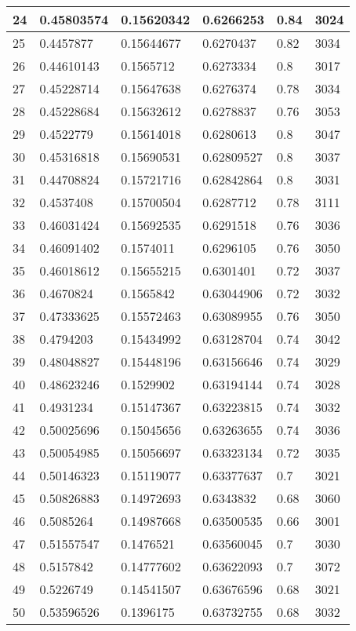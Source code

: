 \begin{longtable}{|l|l|l|l|l|l|}
24 & 0.45803574 & 0.15620342 & 0.6266253 & 0.84 & 3024 \\ \hline 
25 & 0.4457877 & 0.15644677 & 0.6270437 & 0.82 & 3034 \\ \hline 
26 & 0.44610143 & 0.1565712 & 0.6273334 & 0.8 & 3017 \\ \hline 
27 & 0.45228714 & 0.15647638 & 0.6276374 & 0.78 & 3034 \\ \hline 
28 & 0.45228684 & 0.15632612 & 0.6278837 & 0.76 & 3053 \\ \hline 
29 & 0.4522779 & 0.15614018 & 0.6280613 & 0.8 & 3047 \\ \hline 
30 & 0.45316818 & 0.15690531 & 0.62809527 & 0.8 & 3037 \\ \hline 
31 & 0.44708824 & 0.15721716 & 0.62842864 & 0.8 & 3031 \\ \hline 
32 & 0.4537408 & 0.15700504 & 0.6287712 & 0.78 & 3111 \\ \hline 
33 & 0.46031424 & 0.15692535 & 0.6291518 & 0.76 & 3036 \\ \hline 
34 & 0.46091402 & 0.1574011 & 0.6296105 & 0.76 & 3050 \\ \hline 
35 & 0.46018612 & 0.15655215 & 0.6301401 & 0.72 & 3037 \\ \hline 
36 & 0.4670824 & 0.1565842 & 0.63044906 & 0.72 & 3032 \\ \hline 
37 & 0.47333625 & 0.15572463 & 0.63089955 & 0.76 & 3050 \\ \hline 
38 & 0.4794203 & 0.15434992 & 0.63128704 & 0.74 & 3042 \\ \hline 
39 & 0.48048827 & 0.15448196 & 0.63156646 & 0.74 & 3029 \\ \hline 
40 & 0.48623246 & 0.1529902 & 0.63194144 & 0.74 & 3028 \\ \hline 
41 & 0.4931234 & 0.15147367 & 0.63223815 & 0.74 & 3032 \\ \hline 
42 & 0.50025696 & 0.15045656 & 0.63263655 & 0.74 & 3036 \\ \hline 
43 & 0.50054985 & 0.15056697 & 0.63323134 & 0.72 & 3035 \\ \hline 
44 & 0.50146323 & 0.15119077 & 0.63377637 & 0.7 & 3021 \\ \hline 
45 & 0.50826883 & 0.14972693 & 0.6343832 & 0.68 & 3060 \\ \hline 
46 & 0.5085264 & 0.14987668 & 0.63500535 & 0.66 & 3001 \\ \hline 
47 & 0.51557547 & 0.1476521 & 0.63560045 & 0.7 & 3030 \\ \hline 
48 & 0.5157842 & 0.14777602 & 0.63622093 & 0.7 & 3072 \\ \hline 
49 & 0.5226749 & 0.14541507 & 0.63676596 & 0.68 & 3021 \\ \hline 
50 & 0.53596526 & 0.1396175 & 0.63732755 & 0.68 & 3032 \\ \hline 
\end{longtable}
